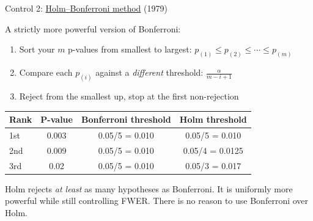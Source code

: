 \documentclass[aspectratio=169,11pt]{beamer}
\begin{document}
\begin{frame}{Control 2: \href{https://en.wikipedia.org/wiki/Holm\%E2\%80\%93Bonferroni_method}{Holm--Bonferroni method} (1979)}

A strictly more powerful version of Bonferroni:

\vspace{0.5em}

\begin{enumerate}\setlength\itemsep{6pt}
  \item {\small Sort your $m$ p-values from smallest to largest: $p_{(1)} \leq p_{(2)} \leq \cdots \leq p_{(m)}$}
  \item {\small Compare each $p_{(i)}$ against a \emph{different} threshold: $\frac{\alpha}{m - i + 1}$}
  \item {\small Reject from the smallest up, stop at the first non-rejection}
\end{enumerate}

\vspace{0.5em}

\begin{center}
{\small
\begin{tabular}{lccc}
\toprule
\textbf{Rank} & \textbf{P-value} & \textbf{Bonferroni threshold} & \textbf{Holm threshold} \\
\midrule
1st & 0.003 & 0.05/5 = 0.010 & 0.05/5 = 0.010 \\
2nd & 0.009 & 0.05/5 = 0.010 & 0.05/4 = 0.0125 \\
3rd & 0.02 & 0.05/5 = 0.010 & 0.05/3 = 0.017 \\
\bottomrule
\end{tabular}
}
\end{center}

\vspace{0.3em}
{\small Holm rejects \emph{at least} as many hypotheses as Bonferroni. It is uniformly more powerful while still controlling FWER. There is no reason to use Bonferroni over Holm.}
\end{frame}
\end{document}
